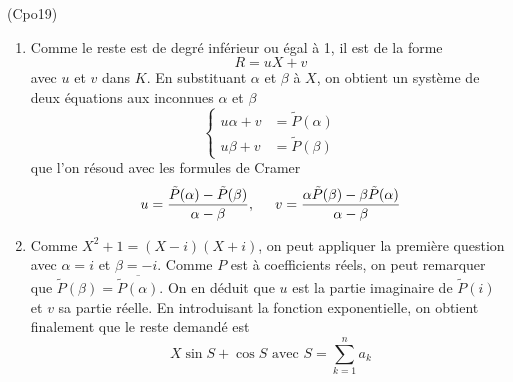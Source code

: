 \begin{tiny}(Cpo19)\end{tiny} \begin{enumerate}
\item Comme le reste est de degré inférieur ou égal à 1, il est de la forme
\begin{displaymath}
R = uX + v
\end{displaymath}
avec $u$ et $v$ dans $K$. En substituant $\alpha$ et $\beta$ à $X$, on obtient un système de deux équations aux inconnues $\alpha$ et $\beta$ 
\begin{displaymath}
\left\lbrace 
\begin{aligned}
u\alpha + v &= \tilde{P}(\alpha) \\ u\beta + v &= \tilde{P}(\beta)
\end{aligned}
\right.
\end{displaymath}
que l'on résoud avec les formules de Cramer
\begin{displaymath}
 u= \frac{\tilde{P}(\alpha)- \tilde{P}(\beta)}{\alpha - \beta},\hspace{0.5cm}
 v= \frac{\alpha\tilde{P}(\beta)- \beta\tilde{P}(\alpha)}{\alpha - \beta}
\end{displaymath}
\item Comme $X^2+1=(X-i)(X+i)$, on peut appliquer la première question avec $\alpha=i$ et $\beta=-i$. Comme $P$ est à coefficients réels, on peut remarquer que $\tilde{P}(\beta)=\overline{\tilde{P}(\alpha)}$. On en déduit que $u$ est la partie imaginaire de $\tilde{P}(i)$ et $v$ sa partie réelle. En introduisant la fonction exponentielle, on obtient finalement que le reste demandé est
\begin{displaymath}
 X\sin S + \cos S \text{ avec } S=\sum_{k=1}^na_k
\end{displaymath}
\end{enumerate}